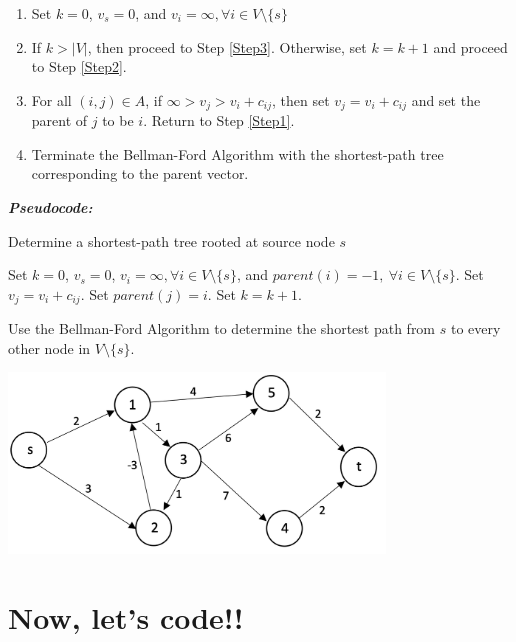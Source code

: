 \documentclass[12pt]{article}
\theoremstyle{definition}
\begin{document}
\begin{enumerate}

\item Set $k = 0$, $v_s = 0$, and $v_i = \infty, \forall i \in V \setminus \{s\}$ \label{Step0}
\item If  $k > |V| $, then proceed to Step \ref{Step3}. Otherwise, set $k = k + 1$ and proceed to Step \ref{Step2}. \label{Step1}
\item For all $(i,j) \in A$, if $\infty > v_j > v_i + c_{ij}$, then set $v_j = v_i + c_{ij}$ and set the parent of $j$ to be $i$. Return to Step \ref{Step1}.  \label{Step2}
\item Terminate the Bellman-Ford Algorithm with the shortest-path tree corresponding to the parent vector. \label{Step3}
\end{enumerate}



\emph{\textbf{Pseudocode:}}


\begin{algorithm}
\caption{Determine a shortest-path tree rooted at source node $s$}
\begin{algorithmic} 
\STATE  Set $k = 0$, $v_s = 0$, $v_i = \infty, \forall i \in V \setminus \{s\}$, and $parent(i) = -1, \ \forall i \in V \setminus \{s\}$. 
			\STATE Set $v_j = v_i + c_{ij}$.
			\STATE Set $parent(j) = i$.
		\ENDIF
	\ENDFOR
	\STATE Set $k = k + 1$.
\ENDWHILE
\end{algorithmic}
\end{algorithm}


 \newpage
Use the Bellman-Ford Algorithm to determine the shortest path from $s$ to every other node in $V \setminus \{s\}$.

\begin{center}
\includegraphics[width=10cm]{shortestpathnegativecycles}
\end{center}

\vfill


\newpage

\section{Now, let's code!!}
\end{document}
